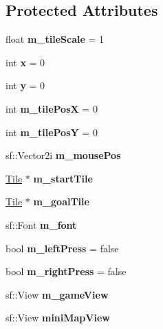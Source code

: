 \subsection*{Protected Attributes}
\begin{DoxyCompactItemize}
\item 
\mbox{\label{class_grid_af1979a0764afd2a0250d884f3043447c}} 
float {\bfseries m\+\_\+tile\+Scale} = 1
\item 
\mbox{\label{class_grid_a248764f64e2d852af8eea8dbf5f002e6}} 
int {\bfseries x} = 0
\item 
\mbox{\label{class_grid_a2d2ff805d92a1b8a571045d63efa83c7}} 
int {\bfseries y} = 0
\item 
\mbox{\label{class_grid_aa51f2b09447305358c16e1c6e9cb2d5b}} 
int {\bfseries m\+\_\+tile\+PosX} = 0
\item 
\mbox{\label{class_grid_a06b1d07d5741a534370675444a201440}} 
int {\bfseries m\+\_\+tile\+PosY} = 0
\item 
\mbox{\label{class_grid_ac36f0e3a8ee0a71df36cee8fcfac07ab}} 
sf\+::\+Vector2i {\bfseries m\+\_\+mouse\+Pos}
\item 
\mbox{\label{class_grid_ac786ba70325d129cedee2decefc0256e}} 
\mbox{\hyperlink{class_tile}{Tile}} $\ast$ {\bfseries m\+\_\+start\+Tile}
\item 
\mbox{\label{class_grid_a7553899282bdbb083033c934629b0b86}} 
\mbox{\hyperlink{class_tile}{Tile}} $\ast$ {\bfseries m\+\_\+goal\+Tile}
\item 
\mbox{\label{class_grid_acd9e58a0b07a16c129336c89237b1eb8}} 
sf\+::\+Font {\bfseries m\+\_\+font}
\item 
\mbox{\label{class_grid_a737d5f9cb9cb17edfb0d6559fb6cfc0f}} 
bool {\bfseries m\+\_\+left\+Press} = false
\item 
\mbox{\label{class_grid_abff1c2c8765deeeb886a703da0e95059}} 
bool {\bfseries m\+\_\+right\+Press} = false
\item 
\mbox{\label{class_grid_a9c2b3bec7b9fe4af5c714cdb48942f39}} 
sf\+::\+View {\bfseries m\+\_\+game\+View}
\item 
\mbox{\label{class_grid_af8fbded1d16cffc323f4b67014cbbfc5}} 
sf\+::\+View {\bfseries mini\+Map\+View}
\end{DoxyCompactItemize}
